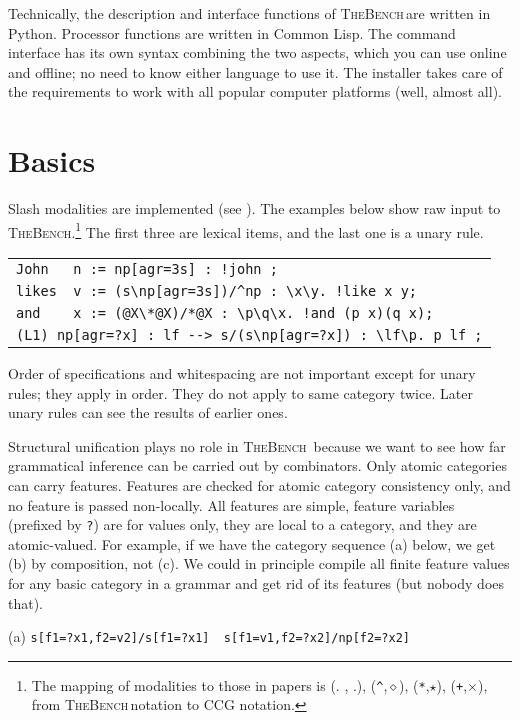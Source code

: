 \documentclass[11pt]{article}
\newcommand{\tool}{\textsc{TheBench}}
\begin{document}
Technically, the description and interface functions of \tool\,are written in Python. Processor functions are written in Common Lisp. The command
interface has its own syntax combining the two aspects, which you can use online and offline; no need to know either language to use it. The installer takes care of the requirements to work with all popular computer platforms (well, almost all).

\section{Basics}\label{sec:basics}
Slash modalities are implemented (see \citealt{baldridge02,steedmanbaldridge-guide}). The examples below show raw input to \tool.\footnote{The mapping of modalities
to those in papers is (. , .), (\verb|^|,$\diamond$), (\verb|*|,$\star$), (\verb|+|,$\times$), from \tool\,notation to CCG notation.} 
The first three are lexical items, { and the last one is a unary  rule}. 


\begin{tabular}{l}
\verb|John   n := np[agr=3s] : !john ;|\\ 
\verb|likes  v := (s\np[agr=3s])/^np : \x\y. !like x y;|\\
\verb|and    x := (@X\*@X)/*@X : \p\q\x. !and (p x)(q x);|\\
\verb|(L1) np[agr=?x] : lf --> s/(s\np[agr=?x]) : \lf\p. p lf ;|
\end{tabular}\medskip

\noindent Order of specifications and whitespacing are not important {except for unary rules; they apply in order. They do
not apply to same category twice}.  {Later unary rules can see the results of earlier ones.}

Structural unification plays no role in \tool\, because we want to see how far grammatical inference can be carried out by combinators. 
Only atomic categories can carry features.
Features are checked for
atomic category consistency only, and no feature is passed non-locally. All features are simple, feature variables (prefixed by \verb+?+) are
for values only, they are local to a category, and they are atomic-valued. For example, if we have the category sequence (a) below, we get
(b) by composition, not (c). We could in principle compile all finite feature values for any basic category in a grammar and get rid of its features (but nobody does that). 

(a) \verb|s[f1=?x1,f2=v2]/s[f1=?x1]  s[f1=v1,f2=?x2]/np[f2=?x2]|
\end{document}
